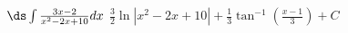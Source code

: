 {$\ds \int \frac{3 x-2}{x^2-2 x+10} dx $}
{$\frac{3}{2} \ln \left|x^2-2 x+10\right|+\frac{1}{3} \tan ^{-1}\left(\frac{x-1}{3}\right)+C$}